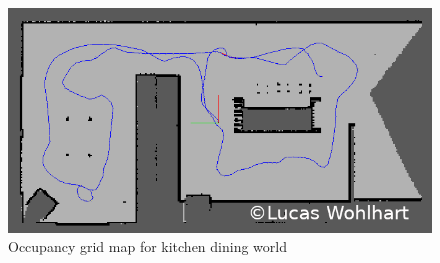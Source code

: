 \documentclass[10pt,journal,compsoc]{IEEEtran}
\begin{document}
\begin{figure}[thpb]
    \centering
    \includegraphics[width=\linewidth]{img/kitchen_occupancy_grid}
    \caption{Occupancy grid map for kitchen dining world}
    \label{fig:kitchen_occupancy_grid}
\end{figure}
\end{document}
